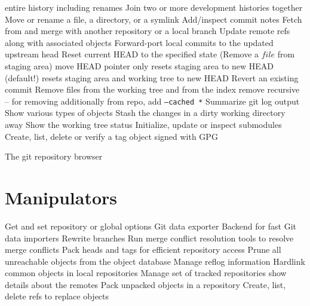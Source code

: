 	{entire history including renames}
	{Join two or more development histories together}
	{Move or rename a file, a directory, or a symlink}
	{Add/inspect commit notes}
	{Fetch from and merge with another re\-pository or a local branch}
	{Update remote refs along with associated objects}
	{Forward-port local commits to the updated upstream head}
	{Reset current HEAD to the specified state (Remove a $file$ from staging area)}
	{move HEAD pointer only}
	{resets staging area to new HEAD (default!)}
	{resets staging area and working tree to new HEAD}
	{Revert an existing commit}
	{Remove files from the working tree and from the index}
	{remove recursive -- for removing additionally from repo, add
{\tt --cached *}}
	{Summarize git log output}
	{Show various types of objects}
	{Stash the changes in a dirty working directory away}
	{Show the working tree status}
	{Initialize, update or inspect submodules}
	{Create, list, delete or verify a tag object signed with GPG}

	{The git repository browser}

\section{Manipulators}
	{Get and set repository or global options}
	{Git data exporter}
	{Backend for fast Git data importers}
	{Rewrite branches}
	{Run merge conflict resolution tools to resolve merge conflicts}
	{Pack heads and tags for efficient repository access}
	{Prune all unreachable objects from the object database}
	{Manage reflog information}
	{Hardlink common objects in local repositories}
	{Manage set of tracked repositories}
	{show details about the remotes}
	{Pack unpacked objects in a repository}
	{Create, list, delete refs to replace objects}

